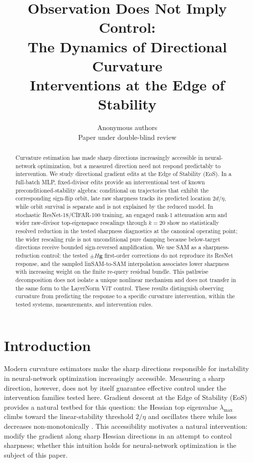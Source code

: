 \documentclass{article}
\title{Observation Does Not Imply Control:\\ The Dynamics of Directional Curvature\\ Interventions at the Edge of Stability}
\author{Anonymous authors\\
Paper under double-blind review}
\theoremstyle{plain}
\theoremstyle{definition}
\theoremstyle{remark}
\newcommand{\lmax}{\lambda_{\max}}
\begin{document}
\maketitle

\begin{abstract}
Curvature estimation has made sharp directions increasingly accessible
in neural-network optimization, but a measured direction need not
respond predictably to intervention. We study directional gradient
edits at the Edge of Stability (EoS). In a full-batch MLP,
fixed-divisor edits provide an interventional test of known
preconditioned-stability algebra: conditional on trajectories that
exhibit the corresponding sign-flip orbit, late raw sharpness tracks
its predicted location $2d/\eta$, while orbit survival is separate and
is not explained by the reduced model. In stochastic
ResNet-18/CIFAR-100 training, an engaged rank-1 attenuation arm and
wider raw-divisor top-eigenspace rescalings through $k{=}20$ show no
statistically resolved reduction in the tested sharpness diagnostics
at the canonical operating point; the wider rescaling rule is not
unconditional pure damping because below-target directions receive
bounded sign-reversed amplification. We use SAM as a
sharpness-reduction control: the tested $\pm H\mathbf{g}$ first-order
corrections do not reproduce its ResNet response, and the sampled
linSAM-to-SAM interpolation associates lower sharpness with increasing
weight on the finite re-query residual bundle. This pathwise
decomposition does not isolate a unique nonlinear mechanism and does
not transfer in the same form to the LayerNorm ViT control. These
results distinguish observing curvature from predicting the response
to a specific curvature intervention, within the tested systems,
measurements, and intervention rules.
\end{abstract}

\section{Introduction}
\label{sec:intro}
Modern curvature estimators make the sharp directions responsible for
instability in neural-network optimization increasingly accessible.
Measuring a sharp direction, however, does not by itself guarantee
effective control under the intervention families tested here. Gradient descent at the
Edge of Stability (EoS) provides a natural testbed for this question:
the Hessian top eigenvalue $\lmax$ climbs toward the linear-stability
threshold $2/\eta$ and oscillates there while loss decreases
non-monotonically \citep{cohen2021eos,damian2023selfstab}. This
accessibility motivates a natural intervention: modify the gradient
along sharp Hessian directions in an attempt to control
sharpness; whether this intuition holds for neural-network
optimization is the subject of this paper.
\end{document}
